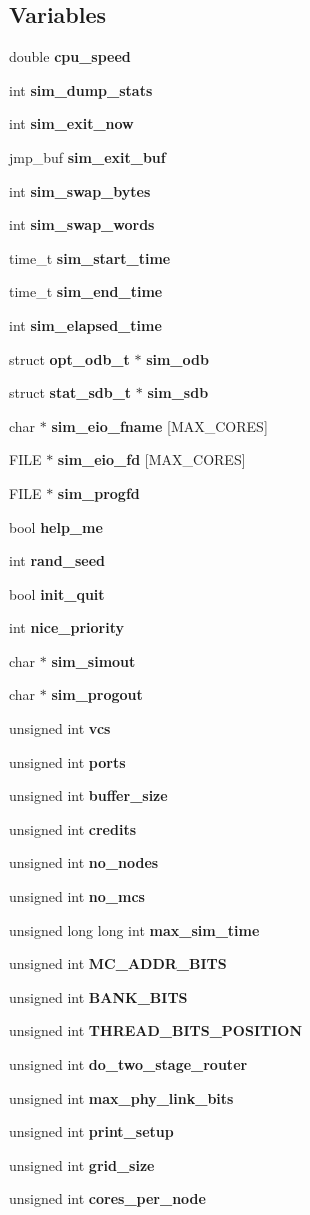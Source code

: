 \subsection*{Variables}
\begin{CompactItemize}
\item 
double {\bf cpu\_\-speed}
\item 
int {\bf sim\_\-dump\_\-stats}
\item 
int {\bf sim\_\-exit\_\-now}
\item 
jmp\_\-buf {\bf sim\_\-exit\_\-buf}
\item 
int {\bf sim\_\-swap\_\-bytes}
\item 
int {\bf sim\_\-swap\_\-words}
\item 
time\_\-t {\bf sim\_\-start\_\-time}
\item 
time\_\-t {\bf sim\_\-end\_\-time}
\item 
int {\bf sim\_\-elapsed\_\-time}
\item 
struct {\bf opt\_\-odb\_\-t} $\ast$ {\bf sim\_\-odb}
\item 
struct {\bf stat\_\-sdb\_\-t} $\ast$ {\bf sim\_\-sdb}
\item 
char $\ast$ {\bf sim\_\-eio\_\-fname} [MAX\_\-CORES]
\item 
FILE $\ast$ {\bf sim\_\-eio\_\-fd} [MAX\_\-CORES]
\item 
FILE $\ast$ {\bf sim\_\-progfd}
\item 
bool {\bf help\_\-me}
\item 
int {\bf rand\_\-seed}
\item 
bool {\bf init\_\-quit}
\item 
int {\bf nice\_\-priority}
\item 
char $\ast$ {\bf sim\_\-simout}
\item 
char $\ast$ {\bf sim\_\-progout}
\item 
unsigned int {\bf vcs}
\item 
unsigned int {\bf ports}
\item 
unsigned int {\bf buffer\_\-size}
\item 
unsigned int {\bf credits}
\item 
unsigned int {\bf no\_\-nodes}
\item 
unsigned int {\bf no\_\-mcs}
\item 
unsigned long long int {\bf max\_\-sim\_\-time}
\item 
unsigned int {\bf MC\_\-ADDR\_\-BITS}
\item 
unsigned int {\bf BANK\_\-BITS}
\item 
unsigned int {\bf THREAD\_\-BITS\_\-POSITION}
\item 
unsigned int {\bf do\_\-two\_\-stage\_\-router}
\item 
unsigned int {\bf max\_\-phy\_\-link\_\-bits}
\item 
unsigned int {\bf print\_\-setup}
\item 
unsigned int {\bf grid\_\-size}
\item 
unsigned int {\bf cores\_\-per\_\-node}
\end{CompactItemize}


